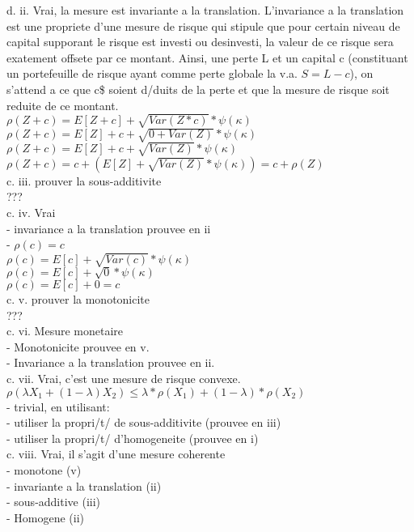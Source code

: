 d. ii. Vrai, la mesure est invariante a la translation. L'invariance a la translation est une propriete d'une mesure de risque qui stipule que pour certain niveau de capital supporant le risque est investi ou desinvesti, la valeur de ce risque sera exatement offsete par ce montant. Ainsi, une perte L et un capital c (constituant un portefeuille de risque ayant comme perte globale la v.a. $S = L-c$), on s'attend a ce que c\$ soient d/duits de la perte et que la mesure de risque soit reduite de ce montant. \\

$\rho(Z+c) = E[Z+c] + \sqrt{Var(Z*c)} * \psi(\kappa)$\\
$\rho(Z+c) = E[Z]+c + \sqrt{0+Var(Z)} * \psi(\kappa)$\\
$\rho(Z+c) = E[Z]+c + \sqrt{Var(Z)} * \psi(\kappa)$\\
$\rho(Z+c) = c + (E[Z] + \sqrt{Var(Z)} * \psi(\kappa)) = c + \rho(Z)$\\

c. iii. prouver la sous-additivite\\
???\\

c. iv. Vrai \\
- invariance a la translation prouvee en ii\\
- $\rho(c) = c$\\

$\rho(c) = E[c] + \sqrt{Var(c)} * \psi(\kappa)$\\
$\rho(c) = E[c] + \sqrt{0} * \psi(\kappa)$\\
$\rho(c) = E[c] + 0 = c$\\

c. v. prouver la monotonicite\\
???\\

c. vi. Mesure monetaire\\
- Monotonicite prouvee en v.\\
- Invariance a la translation prouvee en ii.\\ 

c. vii. Vrai, c'est une mesure de risque convexe. \\
$\rho(\lambda X_1 + (1-\lambda)X_2) \leq \lambda*\rho(X_1) + (1-\lambda)*\rho(X_2)$\\
- trivial, en utilisant:\\
- utiliser la propri/t/ de sous-additivite (prouvee en iii)\\
- utiliser la propri/t/ d'homogeneite (prouvee en i)\\

c. viii. Vrai, il s'agit d'une mesure coherente\\
- monotone (v)\\
- invariante a la translation (ii)\\
- sous-additive (iii)\\
- Homogene (ii)\\